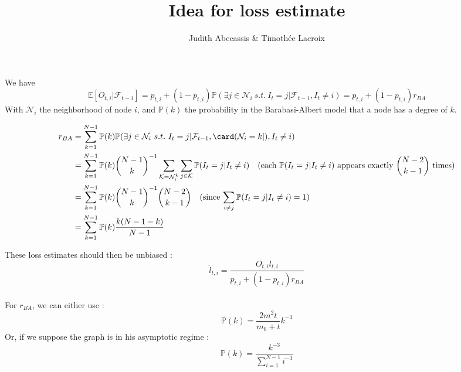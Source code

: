 \documentclass[10pt,a4paper]{scrartcl}
\author{Judith Abecassis \& Timothée Lacroix}
\title{Idea for loss estimate}
\providecommand{\E}{\mathbb{E}}
\providecommand{\Prob}{\mathbb{P}}
\begin{document}
We have
$$\E[O_{t,i} | \mathcal{F}_{t-1}] = p_{t,i} + (1-p_{t,i})\Prob(\exists j \in \mathcal{N}_i~s.t.~I_t=j | \mathcal{F}_{t-1}, I_t\neq i) = p_{t,i} + (1-p_{t,i})r_{BA} $$
With $\mathcal{N}_i$ the neighborhood of node $i$, and $\Prob(k)$ the probability in the Barabasi-Albert model that a node has a degree of $k$.

\begin{align*}
  r_{BA} &= \sum_{k=1}^{N-1} \Prob(k)\Prob(\exists j \in \mathcal{N}_i~s.t.~I_{t}=j | \mathcal{F}_{t-1}, \card(\mathcal{N}_i=k|), I_{t}\neq i)\\
    &= \sum_{k=1}^{N-1} \Prob(k) \binom{N-1}{k}^{-1} \sum_{\mathcal{K} = \mathcal{N}^k_i}\sum_{j \in \mathcal{K}} \Prob(I_t=j|I_t\neq i) \quad \text{(each $\Prob(I_t=j|I_t\neq i)$ appears exactly $\binom{N-2}{k-1}$ times)} \\
    &= \sum_{k=1}^{N-1} \Prob(k) \binom{N-1}{k}^{-1} \binom{N-2}{k-1} \quad \text{(since $\sum_{i \neq j}\Prob(I_t=j|I_t\neq i)=1$)} \\
    &= \sum_{k=1}^{N-1}\Prob(k)\frac{k(N-1-k)}{N-1}
\end{align*}

These loss estimates should then be unbiased : 
$$\hat{l}_{t,i} = \frac{O_{t,i}l_{t,i}}{p_{t,i}+(1-p_{t,i})r_{BA}}$$ \\

For $r_{BA}$, we can either use : 
$$ \Prob(k) = \frac{2m^2t}{m_0+t}k^{-3} $$
Or, if we suppose the graph is in his asymptotic regime : 
$$ \Prob(k) = \frac{k^{-3}}{\sum_{i=1}^{N-1}i^{-3}} $$
\end{document}
